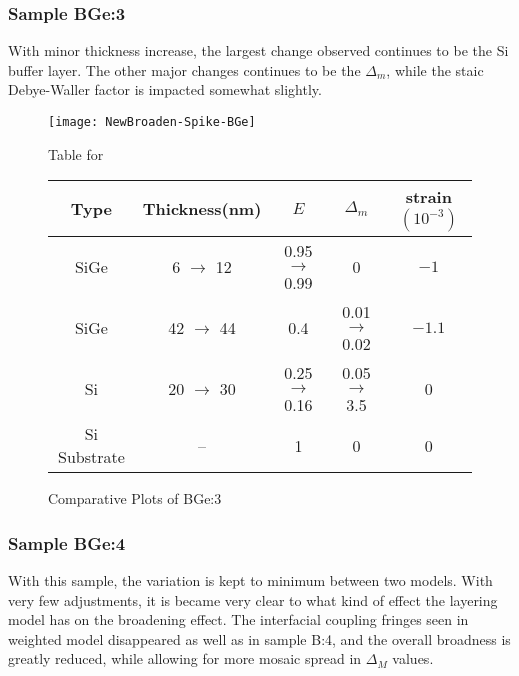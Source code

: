 \subsubsection{Sample BGe:3}

With minor thickness increase, the largest change observed continues to be the Si buffer layer.  The other major changes continues to be the $\Delta_m$, while the staic Debye-Waller factor is impacted somewhat slightly.

\begin{figure}[ht]%
\caption{Comparative Plots of BGe:3}
\label{NBGe3:fig}
\begin{minipage}{\linewidth}
\texttt{[image: NewBroaden-Spike-BGe]}
\end{minipage}
\begin{minipage}{\linewidth}
\centering
\vspace{10pt}
Table for \\
\begin{tabular}[htbp]{@{}c|cccc@{}}
    \hline
  Type & Thickness(nm) & $E$ & $\Delta_m$ & strain $(10^{-3})$ \\
    \hline
  SiGe & 6   $\rightarrow$ 12 & 0.95  $\rightarrow$ 0.99 &0& $-1$  \\
  SiGe & 42   $\rightarrow$ 44 & 0.4 & 0.01  $\rightarrow$ 0.02 & $-1 .1$  \\
Si	& 20  $\rightarrow$ 30	& 0.25  $\rightarrow$ 0.16& 0.05  $\rightarrow$ 3.5& 0\\
  Si Substrate & -- & 1 & 0 & 0
  \end{tabular}
\end{minipage}
\end{figure}

\subsubsection{Sample BGe:4}

With this sample, the variation is kept to minimum between two models.   With very few adjustments, it is became very clear to what kind of effect the layering model has on the broadening effect.  The interfacial coupling fringes seen in weighted model disappeared as well as in sample B:4, and the overall broadness is greatly reduced, while allowing for more mosaic spread in $\Delta_M$ values.

